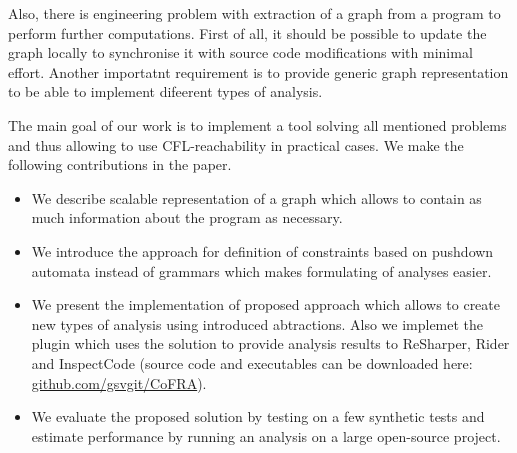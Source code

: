 Also, there is engineering problem with extraction of a graph from a program to perform further computations.
First of all, it should be possible to update the graph locally to synchronise it with source code modifications with minimal effort.
Another importatnt requirement is to provide generic graph representation to be able to implement difeerent types of analysis.

The main goal of our work is to implement a tool solving all mentioned problems and thus allowing to use CFL-reachability in practical cases.
We make the following contributions in the paper.
\begin{itemize}
	\item We describe scalable representation of a graph which allows to contain as much information about the program as necessary.
	\item We introduce the approach for definition of constraints based on pushdown automata instead of grammars which makes formulating of analyses easier.
	\item We present the implementation of proposed approach which allows to create new types of analysis using introduced abtractions.
	Also we implemet the plugin which uses the solution to provide analysis results to ReSharper, Rider and InspectCode (source code and executables can be downloaded here: \url{github.com/gsvgit/CoFRA}).
	\item We evaluate the proposed solution by testing on a few synthetic tests and estimate performance by running an analysis on a large open-source project.
\end{itemize}

